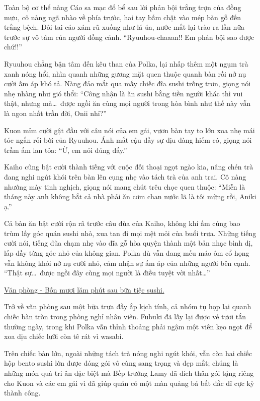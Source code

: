\documentclass[../main.tex]{subfiles}
\begin{document}
Toàn bộ cơ thể nàng Cáo sa mạc đổ bể sau lời phản bội trắng trợn của đồng mưu, cô nàng ngã nhào về phía trước, hai tay bấm chặt vào mép bàn gỗ đến trắng bệch. Đôi tai cáo xám rũ xuống như lá úa, nước mắt lại trào ra lần nữa trước sự vô tâm của người đồng cảnh. ``Ryuuhou-chaaan!! Em phản bội sao được chứ!!''

Ryuuhou chẳng bận tâm đến kêu than của Polka, lại nhấp thêm một ngụm trà xanh nóng hổi, nhìn quanh những gương mặt quen thuộc quanh bàn rồi nở nụ cười ấm áp khó tả. Nàng đảo mắt qua mấy chiếc đĩa sushi trống trơn, giọng nói nhẹ nhàng như gió thổi: ``Công nhận là ăn sushi bằng tiền người khác thì vui thật, nhưng mà\dots\ được ngồi ăn cùng mọi người trong hòa bình như thế này vẫn là ngon nhất trần đời, Onii nhỉ?''

Kuon mỉm cười gật đầu với câu nói của em gái, vươn bàn tay to lớn xoa nhẹ mái tóc ngắn rối bời của Ryuuhou. Ánh mắt cậu đầy sự dịu dàng hiếm có, giọng nói trầm ấm lan tỏa: ``Ừ, em nói đúng đấy.''

Kaiho cũng bật cười thành tiếng với cuộc đối thoại ngọt ngào kia, nâng chén trà đang nghi ngút khói trên bàn lên cụng nhẹ vào tách trà của anh trai. Cô nàng nhướng mày tinh nghịch, giọng nói mang chút trêu chọc quen thuộc: ``Miễn là tháng này anh không bắt cả nhà phải ăn cơm chan nước lã là tôi mừng rồi, Aniki ạ.''

Cả bàn ăn bật cười rộn rã trước câu đùa của Kaiho, không khí ấm cúng bao trùm lấy góc quán sushi nhỏ, xua tan đi mọi mệt mỏi của buổi trưa. Những tiếng cười nói, tiếng đũa chạm nhẹ vào đĩa gỗ hòa quyện thành một bản nhạc bình dị, lấp đầy từng góc nhỏ của không gian. Polka dù vẫn đang mếu máo ôm cổ họng vẫn không khỏi nở nụ cười nhỏ, cảm nhận sự ấm áp của những người bên cạnh. ``Thật sự\dots\ được ngồi đây cùng mọi người là điều tuyệt vời nhất\dots''

\omk

\begin{center}
    \uline{Văn phòng \hll{} - Bốn mươi lăm phút sau bữa tiệc sushi.}
\end{center}

Trở về văn phòng sau một bữa trưa đầy ắp kịch tính, cả nhóm tụ họp lại quanh chiếc bàn tròn trong phòng nghỉ nhân viên. Fubuki đã lấy lại được vẻ tươi tắn thường ngày, trong khi Polka vẫn thỉnh thoảng phải ngậm một viên kẹo ngọt để xoa dịu chiếc lưỡi còn tê rát vì wasabi.

Trên chiếc bàn lớn, ngoài những tách trà nóng nghi ngút khói, vẫn còn hai chiếc hộp bento sushi lớn được đóng gói vô cùng sang trọng và đẹp mắt; chúng là những món quà tri ân đặc biệt mà Bếp trưởng Lamy đã đích thân gói tặng riêng cho Kuon và các em gái vì đã giúp quán có một màn quảng bá bất đắc dĩ cực kỳ thành công.
\end{document}
